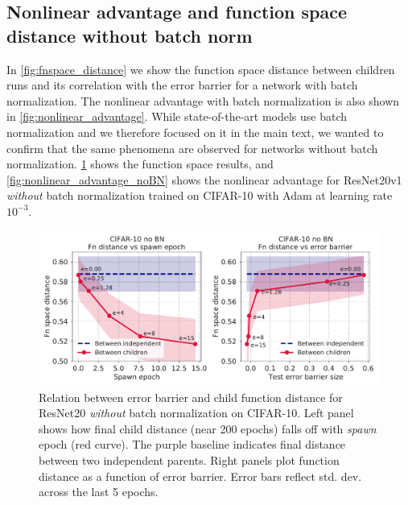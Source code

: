 \documentclass{article}
\begin{document}
%
%
%
%
%
%
%
%
%

\subsection{Nonlinear advantage and function space distance without batch norm}
\label{app:nobn}
In \cref{fig:fnspace_distance} we show the function space distance between children runs and its correlation with the error barrier for a network with batch normalization. The nonlinear advantage with batch normalization is also shown in \cref{fig:nonlinear_advantage}. While state-of-the-art models use batch normalization and we therefore focused on it in the main text, we wanted to confirm that the same phenomena are observed for networks without batch normalization. \cref{fig:fnspace_distance_noBN} shows the function space results, and \cref{fig:nonlinear_advantage_noBN} shows the nonlinear advantage for ResNet20v1 \textit{without} batch normalization trained on CIFAR-10 with Adam at learning rate $10^{-3}$.
%
\begin{figure}[h]
\centering
\includegraphics[width=0.50\linewidth]{figures/fndistance_ResNet_noBN_CIFAR10_1363113.pdf}
\caption{Relation between error barrier and child function distance for ResNet20 \textit{without} batch normalization on CIFAR-10. Left panel shows how final child distance (near 200 epochs) falls off with {\it spawn} epoch (red curve). The purple baseline indicates final distance between two independent parents. Right panels plot function distance as a function of error barrier. Error bars reflect std. dev. across the last 5 epochs.}
\label{fig:fnspace_distance_noBN}
\end{figure}
%
\end{document}
